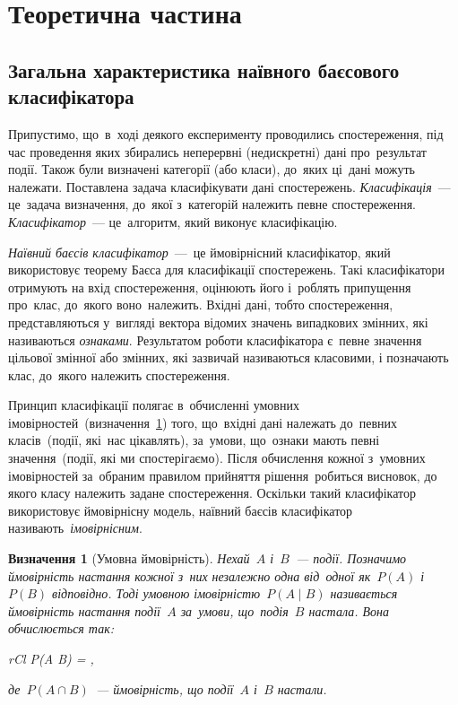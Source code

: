 \documentclass[
	a4paper,
	oneside,
	DIV = 12,
	fontsize = 13pt,
	headings = normal,
	numbers = endperiod,
	bibliography = totoc, %
]{scrartcl}
\theoremstyle{mythm}
\newtheorem{mydef}{Визначення}
\begin{document}
	\newpage
	\tableofcontents

	\newpage
	\section{Теоретична частина}
		\subsection{Загальна характеристика наївного баєсового класифікатора}
			\label{ssec:theory-short}
			Припустимо, що~в~ході деякого експерименту проводились спостереження, під час проведення яких збирались неперервні (недискретні) дані про~результат події. Також були визначені категорії (або класи), до~яких ці~дані можуть належати. Поставлена задача класифікувати дані спостережень. \emph{Класифікація}~— це~задача визначення, до~якої з~категорій належить певне спостереження.~\cite{wiki-stat-classification} \emph{Класифікатор}~— це~алгоритм, який виконує класифікацію.~\cite{wiki-stat-classification}

			\emph{Наївний баєсів класифікатор}~— це ймовірнісний класифікатор, який використовує теорему Баєса для класифікації спостережень. Такі класифікатори отримують на вхід спостереження, оцінюють його і~роблять припущення про~клас, до~якого воно~належить. Вхідні дані, тобто спостереження, представляються у~вигляді вектора відомих значень випадкових змінних, які називаються \emph{ознаками}. Результатом роботи класифікатора є~певне значення цільової змінної або змінних, які зазвичай називаються класовими, і позначають клас, до~якого належить спостереження.

			Принцип класифікації полягає в~обчисленні умовних імовірностей~(визначення~\ref{def:conditional-probability}) того, що~вхідні дані належать до~певних класів~(події, які~нас цікавлять), за~умови, що~ознаки мають певні значення~(події, які ми спостерігаємо). Після обчислення кожної з~умовних імовірностей за~обраним правилом прийняття рішення~робиться висновок, до якого класу належить задане спостереження. Оскільки такий класифікатор використовує ймовірнісну модель, наївний баєсів класифікатор називають~\emph{імовірнісним}.

			\begin{mydef}[Умовна ймовірність]
				\label{def:conditional-probability}
				Нехай~$A$ і~$B$~— події. Позначимо ймовірність настання кожної з~них незалежно одна від~одної як~$P(A)$ і~$P(B)$ відповідно. Тоді \emph{умовною імовірністю}~$P(A \mid B)$ називається ймовірність настання події~$A$ за~умови, що~подія~$B$ настала. Вона обчислюється так:
				\begin{IEEEeqnarray}{rCl}
					P(A \mid B) = ,
				\end{IEEEeqnarray}
				де~$P(A \cap B)$~— ймовірність, що події~$A$ і~$B$ настали. 
			\end{mydef}
			
\end{document}
